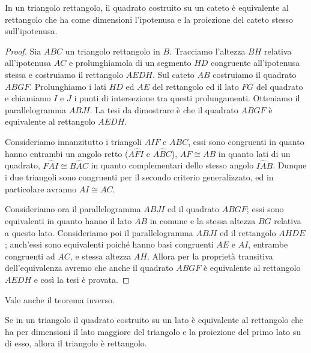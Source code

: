 \begin{teorema}
In un triangolo rettangolo, il quadrato costruito su un cateto è 
equivalente al rettangolo che ha come dimensioni l'ipotenusa e la 
proiezione del cateto stesso sull'ipotenusa.
\end{teorema}


\noindent\begin{minipage}{0.63\textwidth}\parindent15pt
\begin{proof}
Sia $ABC$ un triangolo rettangolo in $B$. Tracciamo l'altezza $BH$ 
relativa all'ipotenusa $AC$ e prolunghiamola di un segmento $HD$ 
congruente all'ipotenusa stessa e costruiamo il rettangolo $AEDH$. 
Sul cateto $AB$ costruiamo il quadrato $ABGF$. Prolunghiamo i lati 
$HD$ ed $AE$ del rettangolo ed il lato $FG$ del quadrato e chiamiamo 
$I$ e $J$ i punti di intersezione tra questi prolungamenti. Otteniamo 
il parallelogramma $ABJI$.
La tesi da dimostrare è che il quadrato $ABGF$ è equivalente al 
rettangolo $AEDH$.

Consideriamo innanzitutto i triangoli $AIF$ e $ABC$, essi sono 
congruenti in quanto hanno entrambi un angolo retto ($A\widehat{F}I$ 
e $A\widehat{B}C$), $AF\cong AB$ in quanto lati di un quadrato, 
$F\widehat{A}I\cong B\widehat{A}C$ in quanto complementari dello 
stesso angolo $I\widehat{A}B$.
Dunque i due triangoli sono congruenti per il secondo criterio 
generalizzato, ed in particolare avranno $AI\cong AC$.

Consideriamo ora il parallelogramma $ABJI$ ed il quadrato $ABGF$; 
essi sono equivalenti in quanto hanno il lato $AB$ in comune e la 
stessa altezza $BG$ relativa a questo lato. 
Consideriamo poi il parallelogramma $ABJI$ ed il rettangolo $AHDE$; 
anch'essi sono equivalenti poiché hanno basi congruenti $AE$ e $AI$, 
entrambe congruenti ad $AC$, e stessa altezza $AH$.
Allora per la proprietà transitiva dell'equivalenza avremo che anche 
il quadrato $ABGF$ è equivalente al rettangolo $AEDH$ e così la tesi 
è provata.
\end{proof}
\end{minipage}\hfil
\begin{minipage}{0.37\textwidth}
	\centering
\end{minipage}\vspace{8pt}

Vale anche il teorema inverso.
\begin{teorema}
Se in un triangolo il quadrato costruito su un lato è equivalente al 
rettangolo che ha per dimensioni il lato maggiore del triangolo e la 
proiezione del primo lato su di esso, allora il triangolo è 
rettangolo.
\end{teorema}

